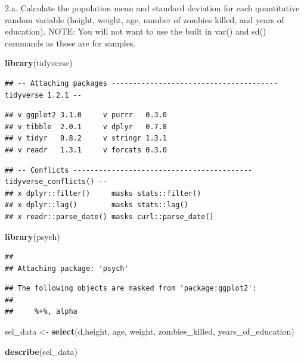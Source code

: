 \documentclass[]{article}
\newenvironment{Shaded}{\begin{snugshade}}{\end{snugshade}}
\newcommand{\KeywordTok}[1]{\textcolor[rgb]{0.13,0.29,0.53}{\textbf{#1}}}
\newcommand{\StringTok}[1]{\textcolor[rgb]{0.31,0.60,0.02}{#1}}
\newcommand{\NormalTok}[1]{#1}
\begin{document}
2.a. Calculate the population mean and standard deviation for each
quantitative random variable (height, weight, age, number of zombies
killed, and years of education). NOTE: You will not want to use the
built in var() and sd() commands as those are for samples.

\begin{Shaded}
\begin{Highlighting}[]
\KeywordTok{library}\NormalTok{(tidyverse)}
\end{Highlighting}
\end{Shaded}

\begin{verbatim}
## -- Attaching packages --------------------------------------- tidyverse 1.2.1 --
\end{verbatim}

\begin{verbatim}
## v ggplot2 3.1.0     v purrr   0.3.0
## v tibble  2.0.1     v dplyr   0.7.8
## v tidyr   0.8.2     v stringr 1.3.1
## v readr   1.3.1     v forcats 0.3.0
\end{verbatim}

\begin{verbatim}
## -- Conflicts ------------------------------------------ tidyverse_conflicts() --
## x dplyr::filter()     masks stats::filter()
## x dplyr::lag()        masks stats::lag()
## x readr::parse_date() masks curl::parse_date()
\end{verbatim}

\begin{Shaded}
\begin{Highlighting}[]
\KeywordTok{library}\NormalTok{(psych)}
\end{Highlighting}
\end{Shaded}

\begin{verbatim}
## 
## Attaching package: 'psych'
\end{verbatim}

\begin{verbatim}
## The following objects are masked from 'package:ggplot2':
## 
##     %+%, alpha
\end{verbatim}

\begin{Shaded}
\begin{Highlighting}[]
\NormalTok{sel_data <-}\StringTok{ }\KeywordTok{select}\NormalTok{(d,height, age, weight, zombies_killed, years_of_education)}

\KeywordTok{describe}\NormalTok{(sel_data)}
\end{Highlighting}
\end{Shaded}
\end{document}

